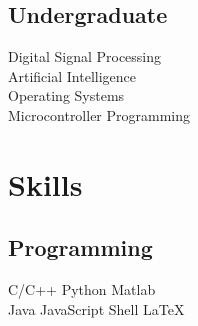 \documentclass[]{deedy-resume-openfont}
\begin{document}
\begin{minipage}[t]{0.33\textwidth}
\subsection{Undergraduate}
Digital Signal Processing \\
Artificial Intelligence \\
Operating Systems \\
Microcontroller Programming \\



\section{Skills}
\subsection{Programming}
C/C++ \textbullet{} Python \textbullet{} Matlab \\
Java \textbullet{} JavaScript  \textbullet{} Shell \textbullet{} \LaTeX\ 
\sectionsep

%
%

\end{minipage} 
\hfill
\end{document}
